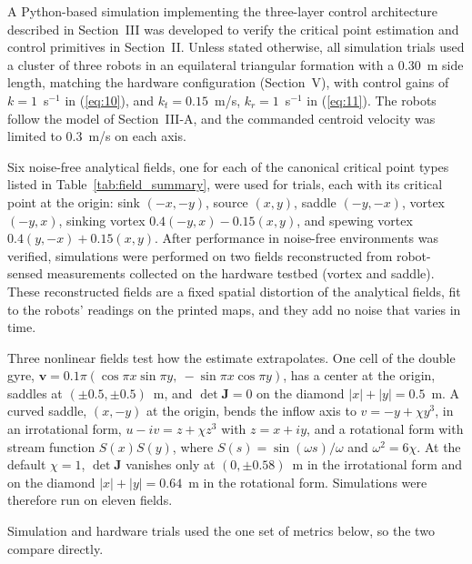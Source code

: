 \documentclass[lettersize,journal]{IEEEtran}
\newcommand{\rev}[1]{#1}
\begin{document}
A Python-based simulation implementing the three-layer control architecture described in Section~III was developed to verify the critical point estimation and control primitives in Section~II. Unless stated otherwise, all simulation trials used a cluster of three robots in an equilateral triangular formation with a \rev{0.30}~m side length, matching the hardware configuration (Section~V), with control gains of $k = 1$~s$^{-1}$ in (\ref{eq:10}), and $k_t = \rev{0.15}$~m/s, $k_r = \rev{1}$~s$^{-1}$ in (\ref{eq:11}). The robots follow the model of Section~III-A, and the commanded centroid velocity was limited to \rev{0.3}~m/s on each axis.

Six noise-free analytical fields, one for each of the canonical critical point types listed in Table~\ref{tab:field_summary}, were used for trials, each with its critical point at the origin: sink $(-x,-y)$, source $(x,y)$, saddle $(-y,-x)$, vortex $(-y,x)$, sinking vortex $0.4(-y,x)-0.15(x,y)$, and spewing vortex $0.4(y,-x)+0.15(x,y)$. After performance in noise-free environments was verified, simulations were performed on two fields reconstructed from robot-sensed measurements collected on the hardware testbed (vortex and saddle). These reconstructed fields are a fixed spatial distortion of the analytical fields, fit to the robots' readings on the printed maps, and they add no noise that varies in time.

Three nonlinear fields test how the estimate extrapolates. One cell of the double gyre, $\mathbf{v} = 0.1\pi(\cos\pi x \sin\pi y,\allowbreak\ -\sin\pi x \cos\pi y)$, has a center at the origin, saddles at $(\pm 0.5, \pm 0.5)$~m, and $\det\mathbf{J} = 0$ on the diamond $|x| + |y| = 0.5$~m. A curved saddle, $(x, -y)$ at the origin, bends the inflow axis to $v = -y + \chi y^3$, in an irrotational form, $u - iv = z + \chi z^3$ with $z = x + iy$, and a rotational form with stream function $S(x)S(y)$, where $S(s) = \sin(\omega s)/\omega$ and $\omega^2 = 6\chi$. At the default $\chi = 1$, $\det\mathbf{J}$ vanishes only at $(0, \pm 0.58)$~m in the irrotational form and on the diamond $|x| + |y| = 0.64$~m in the rotational form. Simulations were therefore run on eleven fields.

Simulation and hardware trials used the one set of metrics below, so the two compare directly.
\end{document}
